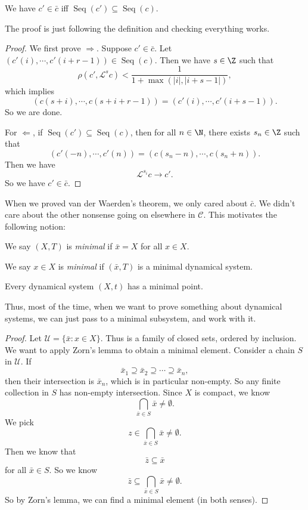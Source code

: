 \documentclass[a4paper]{article}
\DeclareMathOperator\Seq{Seq}
\begin{document}
\begin{prop}
  We have $c' \in \bar{c}$ iff $\Seq(c') \subseteq \Seq(c)$.
\end{prop}
The proof is just following the definition and checking everything works.
\begin{proof}
  We first prove $\Rightarrow$. Suppose $c' \in \bar{c}$. Let $(c'(i) , \cdots, c'(i + r - 1)) \in \Seq(c)$. Then we have $s \in \Z$ such that
  \[
    \rho(c', \mathcal{L}^s c) < \frac{1}{1 + \max(|i|, |i + s - 1|)},
  \]
  which implies
  \[
    (c(s + i), \cdots, c(s + i + r - 1)) = (c'(i), \cdots, c'(i + s - 1)).
  \]
  So we are done.

  For $\Leftarrow$, if $\Seq(c') \subseteq \Seq (c)$, then for all $n \in \N$, there exists $s_n \in \Z$ such that
  \[
    (c'(-n), \cdots, c'(n)) = (c(s_n - n), \cdots, c(s_n + n)).
  \]
  Then we have
  \[
    \mathcal{L}^{s_i} c \to c'.
  \]
  So we have $c' \in \bar{c}$.
\end{proof}

When we proved van der Waerden's theorem, we only cared about $\bar{c}$. We didn't care about the other nonsense going on elsewhere in $\mathcal{C}$. This motivates the following notion:
\begin{defi}
  We say $(X, T)$ is \emph{minimal} if $\bar{x} = X$ for all $x \in X$.

  We say $x \in X$ is \emph{minimal} if $(\bar{x}, T)$ is a minimal dynamical system.
\end{defi}

\begin{prop}
  Every dynamical system $(X, t)$ has a minimal point.
\end{prop}
Thus, most of the time, when we want to prove something about dynamical systems, we can just pass to a minimal subsystem, and work with it.

\begin{proof}
  Let $\mathcal{U} = \{\bar{x}: x \in X\}$. Thus is a family of closed sets, ordered by inclusion. We want to apply Zorn's lemma to obtain a minimal element. Consider a chain $S$ in $\mathcal{U}$. If
  \[
    \bar{x}_1 \supseteq \bar{x}_2 \supseteq \cdots \supseteq \bar{x}_n,
  \]
  then their intersection is $\bar{x}_n$, which is in particular non-empty. So any finite collection in $S$ has non-empty intersection. Since $X$ is compact, we know
  \[
    \bigcap_{\bar{x} \in S} \bar{x} \not= \emptyset.
  \]
  We pick
  \[
    z \in \bigcap_{\bar{x} \in S} \bar{x} \not= \emptyset.
  \]
  Then we know that
  \[
    \bar{z} \subseteq \bar{x}
  \]
  for all $\bar{x} \in S$. So we know
  \[
    \bar{z} \subseteq \bigcap_{\bar{x} \in S} \bar{x} \not= \emptyset.
  \]
  So by Zorn's lemma, we can find a minimal element (in both senses).
\end{proof}
\end{document}
